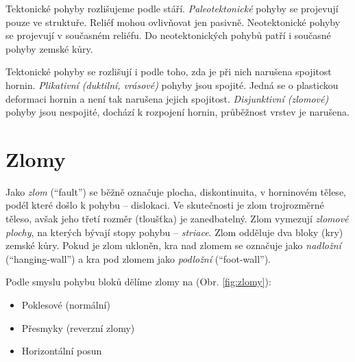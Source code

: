 Tektonické pohyby rozlišujeme podle stáří. \emph{Paleotektonické} pohyby se projevují pouze ve struktuře. Reliéf mohou ovlivňovat jen pasivně. {Neotektonické} pohyby se projevují v současném reliéfu. Do neotektonických pohybů patří i současné pohyby zemské kůry.

Tektonické pohyby se rozlišují i podle toho, zda je při nich narušena spojitost hornin. \emph{Plikativní (duktilní, vrásové)} pohyby jsou spojité. Jedná se o plastickou deformaci hornin a není tak narušena jejich spojitost. \emph{Disjunktivní (zlomové)} pohyby jsou nespojité, dochází k rozpojení hornin, průběžnost vrstev je narušena.

\section{Zlomy}
Jako \emph{zlom} (\enquote{fault}) se běžně označuje plocha, diskontinuita, v horninovém tělese, podél které došlo k pohybu -- dislokaci. Ve skutečnosti je zlom trojrozměrné těleso, avšak jeho třetí rozměr (tloušťka) je zanedbatelný. Zlom vymezují \emph{zlomové plochy}, na kterých bývají stopy pohybu -- \emph{striace}. Zlom odděluje dva bloky (kry) zemské kůry. Pokud je zlom ukloněn, kra nad zlomem se označuje jako \emph{nadložní} (\enquote{hanging-wall}) a kra pod zlomem jako \emph{podložní} (\enquote{foot-wall}).

Podle smyslu pohybu bloků dělíme zlomy na (Obr. \ref{fig:zlomy}):
\begin{itemize}
	\item Poklesové (normální)
	\item Přesmyky (reverzní zlomy)
	\item Horizontální posun
\end{itemize}

